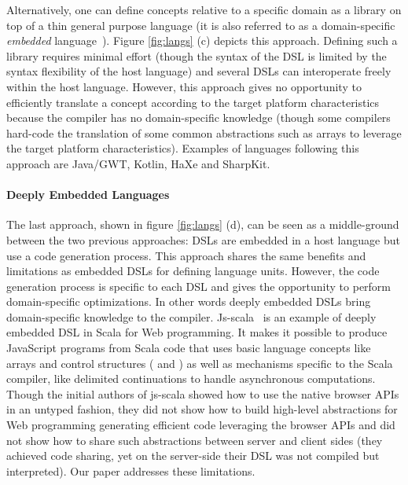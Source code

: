 \documentclass[preprint]{sigplanconf}
\begin{document}
Alternatively, one can define concepts relative to a specific domain as a library on top of a thin
general purpose language (it is also referred to as a domain-specific \emph{embedded}
language~\cite{Hudak96_DSEL}). Figure \ref{fig:langs} (c) depicts this approach. Defining such a
library requires minimal effort (though the syntax of the DSL is limited by the syntax flexibility
of the host language) and several DSLs can interoperate freely within the host language. However,
this approach gives no opportunity to efficiently translate a concept according to the target
platform characteristics because the compiler has no domain-specific knowledge (though some
compilers hard-code the translation of some common abstractions such as arrays to leverage the
target platform characteristics). Examples of languages following this approach are Java/GWT,
Kotlin, HaXe and SharpKit.

\paragraph{Deeply Embedded Languages}

The last approach, shown in figure \ref{fig:langs} (d), can be seen as a middle-ground between the
two previous approaches: DSLs are embedded in a host language but use a code generation process.
This approach shares the same benefits and limitations as embedded DSLs for defining language units.
However, the code generation process is specific to each DSL and gives the opportunity to perform
domain-specific optimizations. In other words deeply embedded DSLs bring domain-specific knowledge
to the compiler. Js-scala~\cite{Kossakowski12_JsDESL} is an example of deeply embedded DSL in Scala
for Web programming. It makes it possible to produce JavaScript programs from Scala code that uses
basic language concepts like arrays and control structures ( and ) as well as
mechanisms specific to the Scala compiler, like delimited continuations to handle asynchronous
computations. Though the initial authors of js-scala showed how to use the native browser APIs in an
untyped fashion, they did not show how to build high-level abstractions for Web programming
generating efficient code leveraging the browser APIs and did not show how to share such
abstractions between server and client sides (they achieved code sharing, yet on the server-side
their DSL was not compiled but interpreted). Our paper addresses these limitations.
\end{document}
